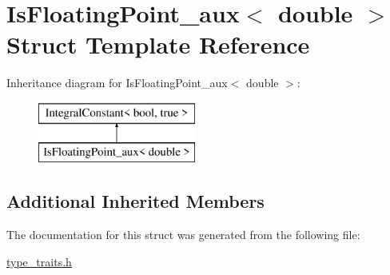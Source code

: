 \hypertarget{struct_is_floating_point__aux_3_01double_01_4}{}\section{Is\+Floating\+Point\+\_\+aux$<$ double $>$ Struct Template Reference}
\label{struct_is_floating_point__aux_3_01double_01_4}
Inheritance diagram for Is\+Floating\+Point\+\_\+aux$<$ double $>$\+:\begin{figure}[H]
\begin{center}
\leavevmode
\includegraphics[height=2.000000cm]{struct_is_floating_point__aux_3_01double_01_4}
\end{center}
\end{figure}
\subsection*{Additional Inherited Members}


The documentation for this struct was generated from the following file\+:\begin{DoxyCompactItemize}
\item 
\hyperlink{type__traits_8h}{type\+\_\+traits.\+h}\end{DoxyCompactItemize}
